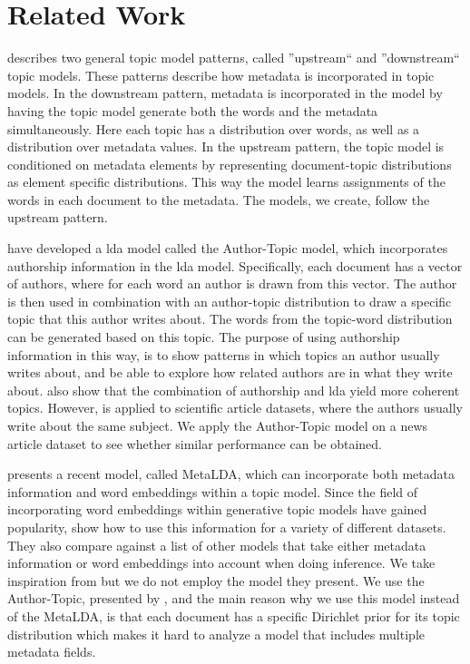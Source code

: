 \section{Related Work}\label{sec:related_work}

\citet{mimno2008topic} describes two general topic model patterns, called ''upstream`` and ''downstream`` topic models.
These patterns describe how metadata is incorporated in topic models.
In the downstream pattern, metadata is incorporated in the model by having the topic model generate both the words and the metadata simultaneously.
Here each topic has a distribution over words, as well as a distribution over metadata values.
In the upstream pattern, the topic model is conditioned on metadata elements by representing document-topic distributions as element specific distributions.
This way the model learns assignments of the words in each document to the metadata.
The models, we create, follow the upstream pattern.

\citet{author_topic_2012} have developed a \gls{lda} model called the Author-Topic model, which incorporates authorship information in the \gls{lda} model.
Specifically, each document has a vector of authors, where for each word an author is drawn from this vector.
The author is then used in combination with an author-topic distribution to draw a specific topic that this author writes about.
The words from the topic-word distribution can be generated based on this topic.
The purpose of using authorship information in this way, is to show patterns in which topics an author usually writes about, and be able to explore how related authors are in what they write about.
\citeauthor{author_topic_2012} also show that the combination of authorship and \gls{lda} yield more coherent topics.
However, \citet{author_topic_2012} is applied to scientific article datasets, where the authors usually write about the same subject.
We apply the Author-Topic model on a news article dataset to see whether similar performance can be obtained.

\citet{MetaLDA2017} presents a recent model, called MetaLDA, which can incorporate both metadata information and word embeddings within a topic model.
Since the field of incorporating word embeddings within generative topic models have gained popularity\cite{dieng2020topic}, \citet{MetaLDA2017} show how to use this information for a variety of different datasets.
They also compare against a list of other models that take either metadata information or word embeddings into account when doing inference.
We take inspiration from \citet{MetaLDA2017} but we do not employ the model they present.
We use the Author-Topic, presented by \citet{author_topic_2012}, and the main reason why we use this model instead of the MetaLDA, is that each document has a specific Dirichlet prior for its topic distribution which makes it hard to analyze a model that includes multiple metadata fields.

